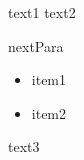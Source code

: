 \documentclass{article}
\begin{document}
text1 %
text2

nextPara
\begin{itemize}
\item item1
\item item2
\end{itemize}

text3
\end{document}
